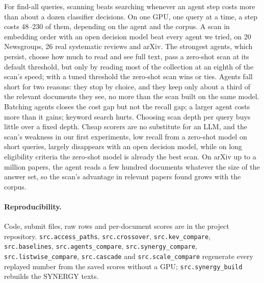 \documentclass[11pt]{article}
\begin{document}
For find-all queries, scanning beats searching whenever an agent step costs
more than about a dozen classifier decisions. On one GPU, one query at a time, a
step costs 48--230 of them, depending on the agent and the corpus. A scan in
embedding order with an open decision model beat every agent we tried, on 20
Newsgroups, 26 real systematic reviews and arXiv. The strongest agents, which
persist, choose how much to read and see full text, pass a zero-shot scan at its
default threshold, but only by reading most of the collection at an eighth of
the scan's speed; with a tuned threshold the zero-shot scan wins or ties. Agents
fall short for two reasons: they stop by choice, and they keep only about a
third of the relevant documents they see, no more than the scan built on the
same model. Batching agents closes the cost gap but not the recall gap;
a larger agent costs more than it gains; keyword search hurts. Choosing scan
depth per query buys little over a fixed depth. Cheap scorers are no substitute
for an LLM, and the scan's weakness in our first experiments, low recall from a
zero-shot model on short queries, largely disappears with an open decision
model, while on long eligibility criteria the zero-shot model is already the
best scan. On arXiv up to a million papers, the agent reads a few hundred
documents whatever the size of the answer set, so the scan's advantage in
relevant papers found grows with the corpus.

\paragraph{Reproducibility.}
Code, submit files, raw rows and per-document scores are in the project
repository. \texttt{src.access\_paths}, \texttt{src.crossover},
\texttt{src.kev\_compare}, \texttt{src.baselines}, \texttt{src.agents\_compare},
\texttt{src.synergy\_compare}, \texttt{src.listwise\_compare},
\texttt{src.cascade} and \texttt{src.scale\_compare} regenerate every replayed number from the saved
scores without a GPU; \texttt{src.synergy\_build} rebuilds the SYNERGY texts.



\end{document}

